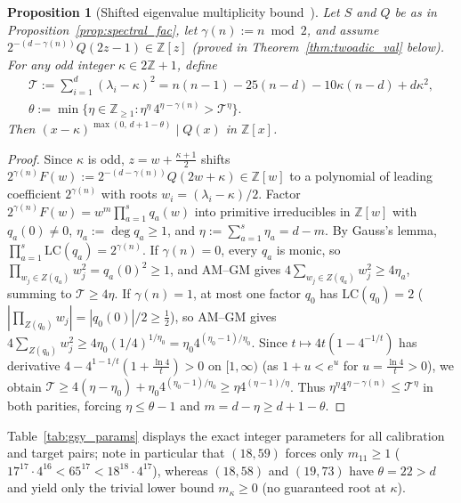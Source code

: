 \documentclass[11pt,reqno]{amsart}
\newtheorem{proposition}[theorem]{Proposition}
\theoremstyle{definition}
\theoremstyle{remark}
\numberwithin{equation}{section}
\numberwithin{table}{section}
\begin{document}
\begin{proposition}[Shifted eigenvalue multiplicity bound~\cite{GSY2021}]\label{prop:gsy_mult}
Let $S$ and $Q$ be as in Proposition~\ref{prop:spectral_fac}, let $\gamma(n) := n \bmod 2$, and assume $2^{-(d - \gamma(n))} Q(2z - 1) \in \mathbb{Z}[z]$ (proved in Theorem~\ref{thm:twoadic_val} below). For any odd integer $\kappa \in 2\mathbb{Z} + 1$, define
\begin{gather*}
  \mathcal{T} := \sum_{i=1}^d (\lambda_i - \kappa)^2 = n(n - 1) - 25(n - d) - 10\kappa(n - d) + d\kappa^2, \\
  \theta := \min\!\big\{\eta \in \mathbb{Z}_{\ge 1} : \eta^\eta\,4^{\eta - \gamma(n)} > \mathcal{T}^\eta\big\}.
\end{gather*}
Then $(x - \kappa)^{\max(0,\, d + 1 - \theta)} \mid Q(x)$ in $\mathbb{Z}[x]$.
\end{proposition}

\begin{proof}
Since $\kappa$ is odd, $z = w + \frac{\kappa + 1}{2}$ shifts $2^{\gamma(n)} F(w) := 2^{-(d - \gamma(n))} Q(2w + \kappa) \in \mathbb{Z}[w]$ to a polynomial of leading coefficient $2^{\gamma(n)}$ with roots $w_i = (\lambda_i - \kappa)/2$. Factor $2^{\gamma(n)} F(w) = w^m \prod_{a=1}^s q_a(w)$ into primitive irreducibles in $\mathbb{Z}[w]$ with $q_a(0) \neq 0$, $\eta_a := \deg q_a \ge 1$, and $\eta := \sum_{a=1}^s \eta_a = d - m$. By Gauss's lemma, $\prod_{a=1}^s \mathrm{LC}(q_a) = 2^{\gamma(n)}$.
If $\gamma(n) = 0$, every $q_a$ is monic, so $\prod_{w_j \in Z(q_a)} w_j^2 = q_a(0)^2 \ge 1$, and AM--GM gives $4\sum_{w_j \in Z(q_a)} w_j^2 \ge 4\eta_a$, summing to $\mathcal{T} \ge 4\eta$.
If $\gamma(n) = 1$, at most one factor $q_0$ has $\mathrm{LC}(q_0) = 2$ ($|\prod_{Z(q_0)} w_j| = |q_0(0)|/2 \ge \frac{1}{2}$), so AM--GM gives $4\sum_{Z(q_0)} w_j^2 \ge 4\eta_0 (1/4)^{1/\eta_0} = \eta_0 4^{(\eta_0 - 1)/\eta_0}$. Since $t \mapsto 4t(1 - 4^{-1/t})$ has derivative $4 - 4^{1 - 1/t}(1 + \frac{\ln 4}{t}) > 0$ on $[1, \infty)$ (as $1 + u < e^u$ for $u = \frac{\ln 4}{t} > 0$), we obtain $\mathcal{T} \ge 4(\eta - \eta_0) + \eta_0 4^{(\eta_0 - 1)/\eta_0} \ge \eta 4^{(\eta - 1)/\eta}$. Thus $\eta^\eta 4^{\eta - \gamma(n)} \le \mathcal{T}^\eta$ in both parities, forcing $\eta \le \theta - 1$ and $m = d - \eta \ge d + 1 - \theta$.
\end{proof}

Table~\ref{tab:gsy_params} displays the exact integer parameters for all calibration and target pairs; note in particular that $(18, 59)$ forces only $m_{11} \ge 1$ ($17^{17} \cdot 4^{16} < 65^{17} < 18^{18} \cdot 4^{17}$), whereas $(18, 58)$ and $(19, 73)$ have $\theta = 22 > d$ and yield only the trivial lower bound $m_\kappa \ge 0$ (no guaranteed root at $\kappa$).
\end{document}
